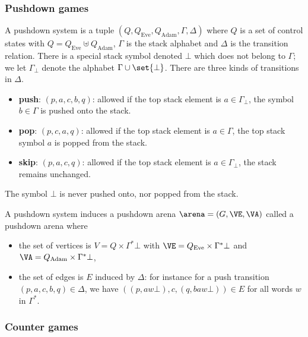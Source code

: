 \subsubsection*{Pushdown games}

\begin{definition}
A pushdown system is a tuple $(Q,Q_{\text{Eve}}, Q_{\text{Adam}}, \Gamma,\Delta)$
where $Q$ is a set of control states with $Q = Q_{\text{Eve}} \uplus Q_{\text{Adam}}$, 
$\Gamma$ is the stack alphabet and $\Delta$ is the transition relation.
There is a special stack symbol denoted $\bot$ which does not belong to $\Gamma$;
we let $\Gamma_\bot$ denote the alphabet $\Gamma \cup \set{\bot}$.
There are three kinds of transitions in $\Delta$.
\begin{itemize}
	\item \textbf{push}: $(p,a,c,b,q)$: allowed if the top stack element is $a \in \Gamma_\bot$, 
	the symbol $b \in \Gamma$ is pushed onto the stack.
	\item \textbf{pop}: $(p,c,a,q)$: allowed if the top stack element is $a \in \Gamma$,
	the top stack symbol $a$ is popped from the stack.
	\item \textbf{skip}: $(p,a,c,q)$: allowed if the top stack element is $a \in \Gamma_\bot$, the stack remains unchanged.
\end{itemize}
The symbol $\bot$ is never pushed onto, nor popped from the stack.

A pushdown system induces a pushdown arena $\arena = (G,\VE,\VA)$ called a pushdown arena where
\begin{itemize}
	\item the set of vertices is $V = Q \times \Gamma^* \bot$ with $\VE = Q_{\text{Eve}} \times \Gamma^* \bot$ 
	and $\VA = Q_{\text{Adam}} \times \Gamma^* \bot$,
	\item the set of edges is $E$ induced by $\Delta$:
	for instance for a push transition $(p,a,c,b,q) \in \Delta$, 
	we have $\left((p,a w \bot),c,(q,baw \bot)\right) \in E$ for all words $w$ in $\Gamma^*$.	
\end{itemize}
\end{definition}

\subsubsection*{Counter games}

